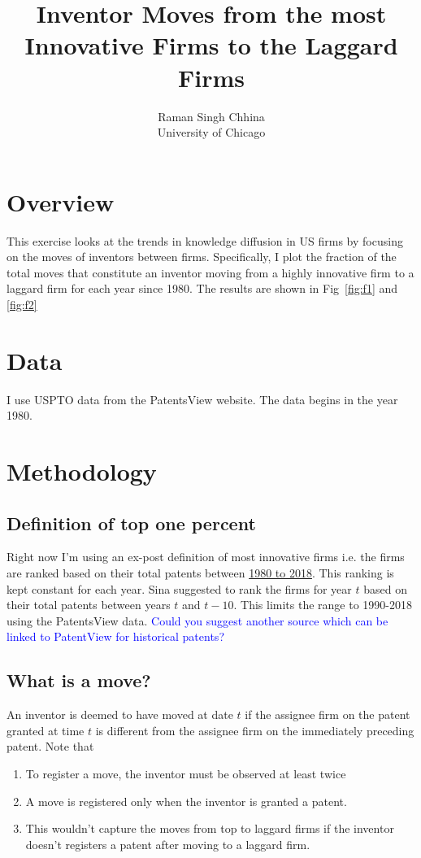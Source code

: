 \documentclass{report}
\title{Inventor Moves from the most Innovative Firms to the Laggard Firms  }
\author{
Raman Singh Chhina \\ {University of Chicago}
}
\date{}
\numberwithin{equation}{section}
\numberwithin{figure}{section}
\numberwithin{table}{section}
\begin{document}
\maketitle

\setcounter{tocdepth}{1}
\tableofcontents
\etocsettocstyle{}{} %

\clearpage
\section{Overview}

This exercise looks at the trends in knowledge diffusion in US firms by focusing on the moves of inventors between firms. Specifically, I plot the fraction of the total moves that constitute an inventor moving from a highly innovative firm to a laggard firm for each year since 1980. The results are shown in Fig~\ref{fig:f1} and \ref{fig:f2}

\section{Data}

I use USPTO data from the PatentsView website. The data begins in the year 1980.

\section{Methodology}

\subsection{Definition of top one percent}
Right now I'm using an ex-post definition of most innovative firms i.e. the firms are ranked based on their total patents between \underline{1980 to 2018}. This ranking is kept constant for each year. Sina suggested to rank the firms for year $t$ based on their total patents between years $t$ and $t-10$. This limits the range to 1990-2018 using the PatentsView data. \textcolor{blue}{Could you suggest another source which can be linked to PatentView for historical patents?}

\subsection{What is a move?}
An inventor is deemed to have moved at date $t$ if the assignee firm on the patent granted at time $t$ is different from the assignee firm on the immediately preceding patent. Note that
\begin{enumerate}
    \item To register a move, the inventor must be observed at least twice
    \item A move is registered only when the inventor is granted a patent.
    \item This wouldn't capture the moves from top to laggard firms if the inventor doesn't registers a patent after moving to a laggard firm. 
\end{enumerate}
\end{document}
